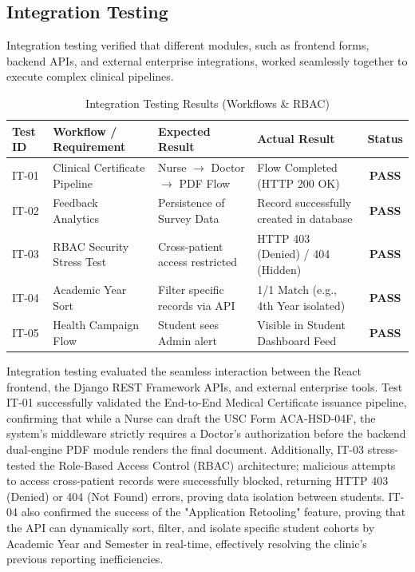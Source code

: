 \subsection{Integration Testing}

Integration testing verified that different modules, such as frontend forms, backend APIs, and external enterprise integrations, worked seamlessly together to execute complex clinical pipelines.

\begin{table}[htbp]
    \centering
    \caption{Integration Testing Results (Workflows \& RBAC)}
    \label{tab:integration_testing}
    \begin{tabularx}{\textwidth}{|l|Y|Y|Y|c|}
        \hline
        \textbf{Test ID} & \textbf{Workflow / Requirement} & \textbf{Expected Result} & \textbf{Actual Result} & \textbf{Status} \\ \hline
        IT-01 & Clinical Certificate Pipeline & Nurse $\rightarrow$ Doctor $\rightarrow$ PDF Flow & Flow Completed (HTTP 200 OK) & \textbf{PASS} \\ \hline
        IT-02 & Feedback Analytics & Persistence of Survey Data & Record successfully created in database & \textbf{PASS} \\ \hline
        IT-03 & RBAC Security Stress Test & Cross-patient access restricted & HTTP 403 (Denied) / 404 (Hidden) & \textbf{PASS} \\ \hline
        IT-04 & Academic Year Sort & Filter specific records via API & 1/1 Match (e.g., 4th Year isolated) & \textbf{PASS} \\ \hline
        IT-05 & Health Campaign Flow & Student sees Admin alert & Visible in Student Dashboard Feed & \textbf{PASS} \\ \hline
    \end{tabularx}
\end{table}

Integration testing evaluated the seamless interaction between the React frontend, the Django REST Framework APIs, and external enterprise tools. Test IT-01 successfully validated the End-to-End Medical Certificate issuance pipeline, confirming that while a Nurse can draft the USC Form ACA-HSD-04F, the system's middleware strictly requires a Doctor's authorization before the backend dual-engine PDF module renders the final document. Additionally, IT-03 stress-tested the Role-Based Access Control (RBAC) architecture; malicious attempts to access cross-patient records were successfully blocked, returning HTTP 403 (Denied) or 404 (Not Found) errors, proving data isolation between students. IT-04 also confirmed the success of the "Application Retooling" feature, proving that the API can dynamically sort, filter, and isolate specific student cohorts by Academic Year and Semester in real-time, effectively resolving the clinic's previous reporting inefficiencies.

